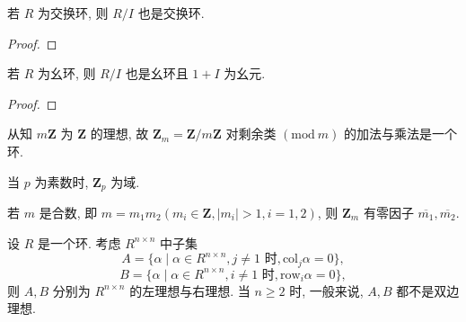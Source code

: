 \documentclass[../../main.tex]{subfiles}
\begin{document}
\begin{corollary}\label{corollary:抽象代数-推论 1.4.1}
若 \( R \) 为交换环, 则 \( R/I \) 也是交换环.
\end{corollary}
\begin{proof}


\end{proof}

\begin{corollary}\label{corollary:抽象代数-推论 1.4.2}
若 \( R \) 为幺环, 则 \( R/I \) 也是幺环且 \( 1 + I \) 为幺元.
\end{corollary}
\begin{proof}


\end{proof}

\begin{example}
从知 \( m\mathbf{Z} \) 为 \( \mathbf{Z} \) 的理想, 故 \( \mathbf{Z}_m = \mathbf{Z}/m\mathbf{Z} \) 对剩余类 \( (\text{mod}\ m) \) 的加法与乘法是一个环.

当 \( p \) 为素数时, \( \mathbf{Z}_p \) 为域.

若 \( m \) 是合数, 即 \( m = m_1m_2 (m_i \in \mathbf{Z}, |m_i| > 1, i = 1,2) \), 则 \( \mathbf{Z}_m \) 有零因子 \( \overline{m_1}, \overline{m_2} \).
\end{example}

\begin{example}
设 \( R \) 是一个环. 考虑 \( R^{n \times n} \) 中子集
\[
A = \{\alpha \mid \alpha \in R^{n \times n}, j \neq 1 \text{ 时}, \text{col}_j\alpha = 0\},
\]
\[
B = \{\alpha \mid \alpha \in R^{n \times n}, i \neq 1 \text{ 时}, \text{row}_i\alpha = 0\},
\]
则 \( A, B \) 分别为 \( R^{n \times n} \) 的左理想与右理想. 当 \( n \geqslant 2 \) 时, 一般来说, \( A, B \) 都不是双边理想.
\end{example}
\end{document}
